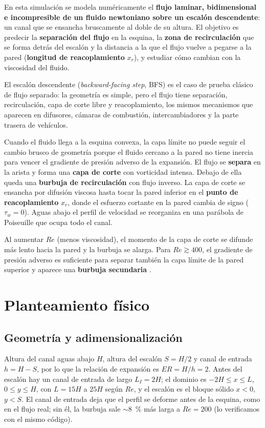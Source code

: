 \documentclass[11pt,letterpaper]{article}
\newcommand{\Rey}{\mathit{Re}}
\begin{document}
En esta simulación se modela numéricamente el \textbf{flujo laminar, bidimensional e incompresible de un fluido
newtoniano sobre un escalón descendente}: un canal que se ensancha bruscamente al doble de su altura. El objetivo es
predecir la \textbf{separación del flujo} en la esquina, la \textbf{zona de recirculación} que se forma detrás del escalón
y la distancia a la que el flujo vuelve a pegarse a la pared (\textbf{longitud de reacoplamiento} $x_r$), y estudiar cómo
cambian con la viscosidad del fluido.

El escalón descendente (\emph{backward-facing step}, BFS) es el caso de prueba clásico de flujo separado: la geometría
es simple, pero el flujo tiene separación, recirculación, capa de corte libre y reacoplamiento, los mismos mecanismos que
aparecen en difusores, cámaras de combustión, intercambiadores y la parte trasera de vehículos.

Cuando el fluido llega a la esquina convexa, la capa límite no puede seguir el cambio brusco de geometría porque el fluido
cercano a la pared no tiene inercia para vencer el gradiente de presión adverso de la expansión. El flujo se
\textbf{separa} en la arista y forma una \textbf{capa de corte} con vorticidad intensa. Debajo de ella queda una
\textbf{burbuja de recirculación} con flujo inverso. La capa de corte se ensancha por difusión viscosa hasta tocar la
pared inferior en el \textbf{punto de reacoplamiento} $x_r$, donde el esfuerzo cortante en la pared cambia de signo
($\tau_w=0$). Aguas abajo el perfil de velocidad se reorganiza en una parábola de Poiseuille que ocupa todo el canal.

Al aumentar $\Rey$ (menos viscosidad), el momento de la capa de corte se difunde más lento hacia la pared y la burbuja se
alarga. Para $\Rey\gtrsim400$, el gradiente de presión adverso es suficiente para separar también la capa límite de la
pared superior y aparece una \textbf{burbuja secundaria} \cite{armaly}.

\section{Planteamiento físico}

\subsection{Geometría y adimensionalización}

Altura del canal aguas abajo $H$, altura del escalón $S=H/2$ y canal de entrada $h=H-S$, por lo que la relación de
expansión es $ER=H/h=2$. Antes del escalón hay un canal de entrada de largo $L_I=2H$; el dominio es
$-2H\le x\le L$, $0\le y\le H$, con $L=15H$ a $25H$ según $\Rey$, y el escalón es el bloque sólido $x<0$, $y<S$. El canal
de entrada deja que el perfil se deforme antes de la esquina, como en el flujo real; sin él, la burbuja sale
$\sim$\SI{8}{\percent} más larga a $\Rey=200$ (lo verificamos con el mismo código).
\end{document}
